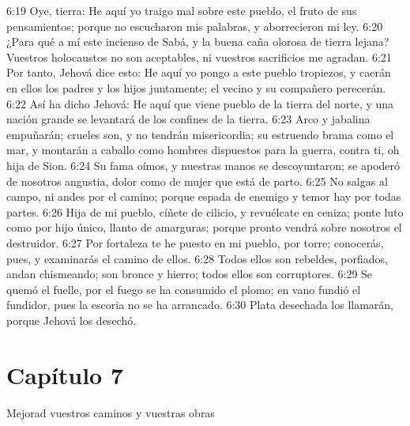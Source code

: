 6:19 Oye, tierra: He aquí yo traigo mal sobre este pueblo, el fruto de sus pensamientos; porque no escucharon mis palabras, y aborrecieron mi ley. 
6:20 ¿Para qué a mí este incienso de Sabá, y la buena caña olorosa de tierra lejana? Vuestros holocaustos no son aceptables, ni vuestros sacrificios me agradan. 
6:21 Por tanto, Jehová dice esto: He aquí yo pongo a este pueblo tropiezos, y caerán en ellos los padres y los hijos juntamente; el vecino y su compañero perecerán. 
6:22 Así ha dicho Jehová: He aquí que viene pueblo de la tierra del norte, y una nación grande se levantará de los confines de la tierra. 
6:23 Arco y jabalina empuñarán; crueles son, y no tendrán misericordia; su estruendo brama como el mar, y montarán a caballo como hombres dispuestos para la guerra, contra ti, oh hija de Sion. 
6:24 Su fama oímos, y nuestras manos se descoyuntaron; se apoderó de nosotros angustia, dolor como de mujer que está de parto. 
6:25 No salgas al campo, ni andes por el camino; porque espada de enemigo y temor hay por todas partes. 
6:26 Hija de mi pueblo, cíñete de cilicio, y revuélcate en ceniza; ponte luto como por hijo único, llanto de amarguras; porque pronto vendrá sobre nosotros el destruidor. 
6:27 Por fortaleza te he puesto en mi pueblo, por torre; conocerás, pues, y examinarás el camino de ellos. 
6:28 Todos ellos son rebeldes, porfiados, andan chismeando; son bronce y hierro; todos ellos son corruptores. 
6:29 Se quemó el fuelle, por el fuego se ha consumido el plomo; en vano fundió el fundidor, pues la escoria no se ha arrancado. 
6:30 Plata desechada los llamarán, porque Jehová los desechó. 
\section*{Capítulo 7} 
Mejorad vuestros caminos y vuestras obras 
 
